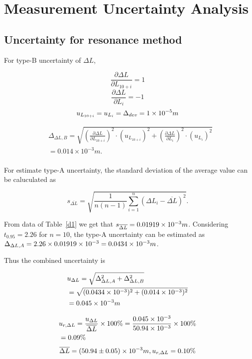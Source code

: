 \section{Measurement Uncertainty Analysis}

\subsection{Uncertainty for resonance method}

For type-B uncertainty of $\Delta L$,

$$ \frac{\partial \Delta L}{\partial L_{10+i}}=1 $$
$$ \frac{\partial \Delta L}{\partial L_i}=-1 $$
$$ u_{L_{10+i}}=u_{L_i}=\Delta_{dev}=1\times 10^{-5}m $$  

\[
\begin{split}
    &\Delta_{\Delta L,B}=\sqrt{(\frac{\partial \Delta L}{\partial
        L_{10+i}})^2\cdot (u_{L_{10+i}})^2+(\frac{\partial \Delta
        L}{\partial L_i})^2\cdot (u_{L_i})^2}\\ 
    &=0.014 \times 10^{-3}m.\\
\end{split}
\]

For estimate type-A uncertainty,
the standard deviation of the average value can be caluculated as

\[
    s_{\overline{\Delta L}}=\sqrt{\frac{1}{n(n-1)}\sum_{i=1}^n(\Delta
      L_i-\overline{\Delta L})^2}. 
\]

From data of Table~\ref{d1} we get that
$s_{\overline{\Delta L}} = 0.01919\times 10^{-3}m$.
Considering $t_{0.95}=2.26$ for $n=10$,
the type-A uncertainty can be estimated as
$\Delta_{\Delta L,A}=2.26 \times 0.01919\times 10^{-3} = 0.0434\times 10^{-3}m$.

Thus the combined uncertainty is 

\[
\begin{split}
    &u_{\Delta L}=\sqrt{\Delta_{\Delta L,A}^2+\Delta_{\Delta
        L,B}^2} \\
    &= \sqrt{(0.0434\times 10^{-3})^2+(0.014\times 10^{-3})^2} \\
    &= 0.045\times 10^{-3}m\\ 
\end{split}
\]
    
\[
\begin{split}
    &u_{r,\Delta L}=\frac{u_{\Delta L}}{\overline{\Delta L}}\times
    100\%=\frac{0.045\times 10^{-3}}{50.94\times 10^{-3}}\times100\% \\
    &=0.09\%\\ 
\end{split}
\]
$$\overline{\Delta L}=(50.94 \pm 0.05)\times 10^{-3}m, u_{r,\Delta L}=0.10\% $$
  


